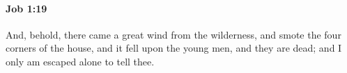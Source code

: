 
		\paragraph{Job 1:19} %
			\label{JOB-1-19}

			And, behold, there came a great wind from the wilderness, and smote the four corners of the house, and it fell upon the young men, and they are dead; and I only am escaped alone to tell thee.


